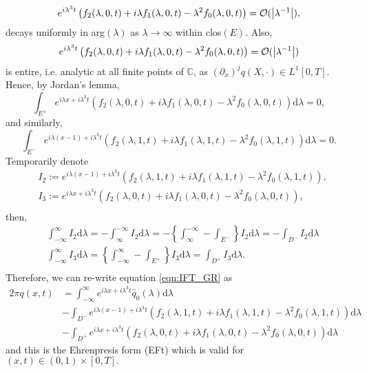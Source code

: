 $$e^{i\lambda^3 t}\left(f_2(\lambda,0,t) + i\lambda f_1(\lambda,0,t) - \lambda^2 f_0(\lambda,0,t)\right) = \mathcal{O}(\left\lvert\lambda^{-1}\right\rvert),$$
decays uniformly in arg$(\lambda)$ as $\lambda \rightarrow \infty$ within clos$(E)$.
Also, 
$$e^{i\lambda^3 t}\left(f_2(\lambda,0,t) + i\lambda f_1(\lambda,0,t) - \lambda^2 f_0(\lambda,0,t)\right) = \mathcal{O}(\left\lvert\lambda^{-1}\right\rvert)$$
is entire, i.e. analytic at all finite points of $\mathbb{C}$, as $(\partial_x)^jq(X,\cdot) \in L^1[0, T]$. Hence, by Jordan's lemma,
$$
    \int_{E^+} e^{i\lambda x+i\lambda^3 t}\left(f_2(\lambda,0,t) + i\lambda f_1(\lambda,0,t) - \lambda^2 f_0(\lambda,0,t)\right) \mathrm{d}\lambda = 0,
$$ 
and similarly,
$$
    \int_{E^-} e^{i\lambda (x-1)+i\lambda^3 t}\left(f_2(\lambda,1,t) + i\lambda f_1(\lambda,1,t) - \lambda^2 f_0(\lambda,1,t)\right) \mathrm{d}\lambda = 0.
$$
Temporarily denote
\begin{align*}
    &I_2 := e^{i\lambda (x-1)+i\lambda^3 t}\left(f_2(\lambda,1,t) + i\lambda f_1(\lambda,1,t) - \lambda^2 f_0(\lambda,1,t)\right), \\
    &I_3 := e^{i\lambda x+i\lambda^3 t}\left(f_2(\lambda,0,t) + i\lambda f_1(\lambda,0,t) - \lambda^2 f_0(\lambda,0,t)\right), \\
\end{align*} then,
\begin{align*}
    &\int_{-\infty}^{\infty} I_2 \mathrm{d}\lambda = -\int_{\infty}^{-\infty} I_2 \mathrm{d}\lambda = -\left\{\int_{\infty}^{-\infty} - \int_{E^-}\right\} I_2 \mathrm{d}\lambda = -\int_{D^-} I_2 \mathrm{d}\lambda \\
    &\int_{-\infty}^{\infty} I_3 \mathrm{d}\lambda = \left\{\int_{-\infty}^{\infty} - \int_{E^+}\right\} I_3 \mathrm{d}\lambda = \int_{D^+} I_3 \mathrm{d}\lambda. \\
\end{align*}
Therefore, we can re-write equation \ref{eqn:IFT_GR} as
\begin{align}
2\pi q(x,t) &= \int_{-\infty}^{\infty} e^{i\lambda x + i\lambda^3 t} \widehat{q}_0(\lambda) \mathrm{d}\lambda \label{eqn:EFt}\\ 
&- \int_{D^-} e^{i\lambda (x-1)+i\lambda^3 t}\left(f_2(\lambda,1,t) + i\lambda f_1(\lambda,1,t) - \lambda^2 f_0(\lambda,1,t)\right) \mathrm{d}\lambda \nonumber \\
&- \int_{D^+} e^{i\lambda x+i\lambda^3 t}\left(f_2(\lambda,0,t) + i\lambda f_1(\lambda,0,t) - \lambda^2 f_0(\lambda,0,t)\right) \mathrm{d}\lambda \nonumber
\end{align}
and this is the Ehrenpresis form (EFt) which is valid for $(x,t) \in (0,1) \times [0,T].$

